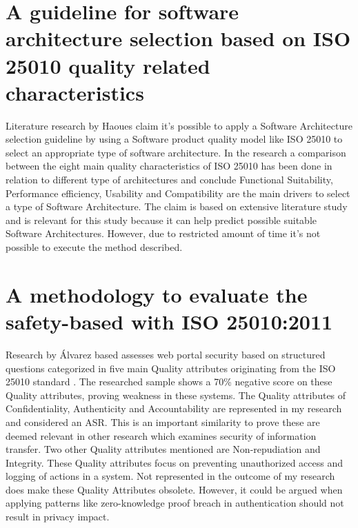 \section{A guideline for software architecture selection based on ISO 25010 quality related characteristics}
Literature research by Haoues \etal \cite{Haoues2017AGF} claim it's possible to apply a Software Architecture selection guideline by using a Software product quality model like ISO 25010 \cite{ISO:25010:2011} to select an appropriate type of software architecture. In the research a comparison between the eight main quality characteristics of ISO 25010 has been done in relation to different type of architectures and conclude Functional Suitability, Performance efficiency, Usability and Compatibility are the main drivers to select a type of Software Architecture. The claim is based on extensive literature study and is relevant for this study because it can help predict possible suitable Software Architectures. However, due to restricted amount of time it's not possible to execute the method described. 

\section{A methodology to evaluate the safety-based with ISO 25010:2011}
Research by {\'A}lvarez \etal \cite{Mexlvarez2021AMT} based assesses web portal security based on structured questions categorized in five main Quality attributes originating from the ISO 25010 standard \cite{ISO:25010:2011}. The researched sample shows a 70\% negative score on these Quality attributes, proving weakness in these systems. The Quality attributes of Confidentiality, Authenticity and Accountability are represented in my research and considered an ASR. This is an important similarity to prove these are deemed relevant in other research which examines security of information transfer. Two other Quality attributes mentioned are Non-repudiation and Integrity. These Quality attributes focus on preventing unauthorized access and logging of actions in a system. Not represented in the outcome of my research does make these Quality Attributes obsolete. However, it could be argued when applying patterns like zero-knowledge proof breach in authentication should not result in privacy impact.